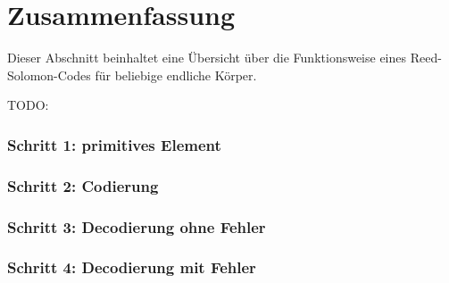 \section{Zusammenfassung
\label{reedsolomon:section:zf}}
Dieser Abschnitt beinhaltet eine Übersicht über die Funktionsweise eines Reed-Solomon-Codes für beliebige endliche Körper.

TODO:

\subsubsection{Schritt 1: primitives Element}

\subsubsection{Schritt 2: Codierung}

\subsubsection{Schritt 3: Decodierung ohne Fehler}

\subsubsection{Schritt 4: Decodierung mit Fehler}

